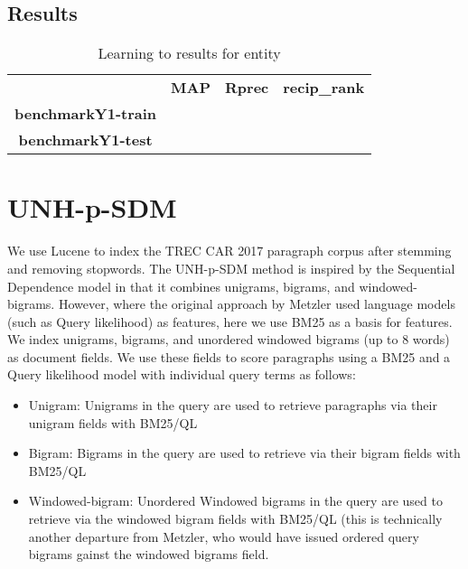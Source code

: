 \documentclass{article}
\begin{document}
\subsection{Results}

\begin{table}[H]
\centering
\begin{tabular}{clll}
\multicolumn{1}{l}{}       & \multicolumn{1}{c}{\textbf{MAP}} & \multicolumn{1}{c}{\textbf{Rprec}} & \multicolumn{1}{c}{\textbf{recip\_rank}} \\
\textbf{benchmarkY1-train} &                                  &                                    &                                          \\
\textbf{benchmarkY1-test}  &                                  &                                    &                                         
\end{tabular}
\caption{Learning to results for entity}
\end{table}




\section{UNH-p-SDM}\label{sec:sdm}

We use Lucene to index the TREC CAR 2017 paragraph corpus after stemming and removing stopwords.
The UNH-p-SDM method is inspired by the Sequential Dependence model \cite{metzler2005markov} in that it combines unigrams, bigrams, and windowed-bigrams. However, where the original approach by Metzler used language models (such as Query likelihood) as features, here we use BM25 as a basis for features. 
 We index unigrams, bigrams, and unordered windowed bigrams (up to 8 words) as document fields. We use these fields to score paragraphs using a BM25 and a Query likelihood model with individual query terms as follows:
 
 \begin{itemize}
     \item Unigram: Unigrams in the query are used to retrieve paragraphs via their unigram fields with BM25/QL
     \item Bigram: Bigrams in the query are used to retrieve via their bigram fields with BM25/QL
     \item Windowed-bigram: Unordered Windowed bigrams in the query are used to retrieve via the windowed bigram fields with BM25/QL (this is technically another departure from Metzler, who would have issued ordered query bigrams gainst the windowed bigrams field.
 \end{itemize}
 
\end{document}
